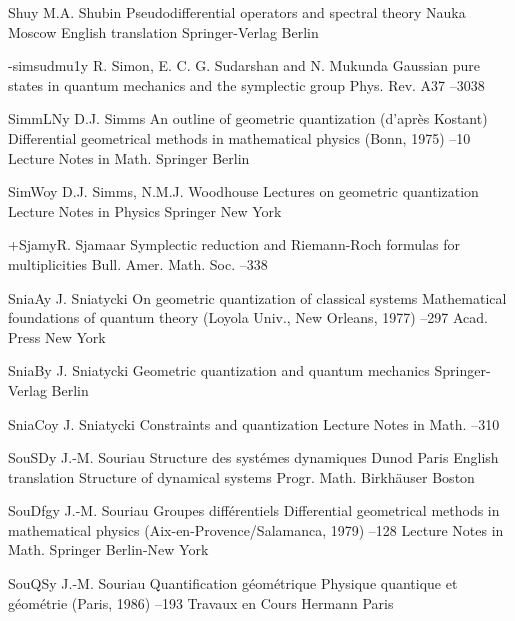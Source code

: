 \documentclass[12pt]{amsart}
\numberwithin{equation}{section}
\theoremstyle{remark}
\newcommand{\by}{\mathbf y}
\begin{document}
\begin{thebibliography}{199}
 Shu\by{ M.A. Shubin \book Pseudodifferential operators and spectral
theory \publ Nauka \publaddr Moscow  \transl English translation
\publ Springer-Verlag \publaddr Berlin }

 -simsudmu1\by{ R. Simon, E. C. G. Sudarshan and N. Mukunda \paper
Gaussian pure states in quantum mechanics and the symplectic group
\jour Phys. Rev.  \vol A37  --3038}

 SimmLN\by{ D.J. Simms \paper An outline of geometric quantization
(d'apr\`es Kostant) \inbook Differential geometrical methods in mathematical
physics (Bonn, 1975) --10 \bookinfo Lecture Notes in Math. 
\publ Springer \publaddr Berlin }

 SimWo\by{ D.J. Simms, N.M.J. Woodhouse \book Lectures on geometric
quantization \bookinfo Lecture Notes in Physics  \publ Springer
\publaddr New York }

 +Sjam\by{R. Sjamaar \paper Symplectic reduction and Riemann-Roch formulas
for multiplicities \jour Bull. Amer. Math. Soc.   --338}

 SniaA\by{ J. Sniatycki \paper On geometric quantization of classical
systems \inbook Mathematical foundations of quantum theory (Loyola Univ., New
Orleans, 1977) --297 \publ Acad. Press \publaddr New York }

 SniaB\by{ J. Sniatycki \book Geometric quantization and quantum mechanics
\publ Springer-Verlag \publaddr Berlin }

 SniaCo\by{ J. Sniatycki \paper Constraints and quantization \inbook
Lecture Notes in Math.  --310 }

 SouSD\by{ J.-M. Souriau \book Structure des syst\'emes dynamiques \publ
Dunod \publaddr Paris  \transl English translation \book Structure of
dynamical systems \bookinfo Progr. Math.  \publ Birkh\"auser \publaddr
Boston }

 SouDfg\by{ J.-M. Souriau \paper Groupes diff\'erentiels \inbook
Differential geometrical methods in mathematical physics
(Aix-en-Provence/Salamanca, 1979) --128 \bookinfo Lecture Notes in
Math.  \publ Springer \publaddr Berlin-New York }

 SouQS\by{ J.-M. Souriau \paper Quantification g\'eom\'etrique \inbook
Physique quantique et g\'eom\'etrie (Paris, 1986) --193 \bookinfo
Travaux en Cours  \publ Hermann \publaddr Paris }


\end{thebibliography}
\end{document}

